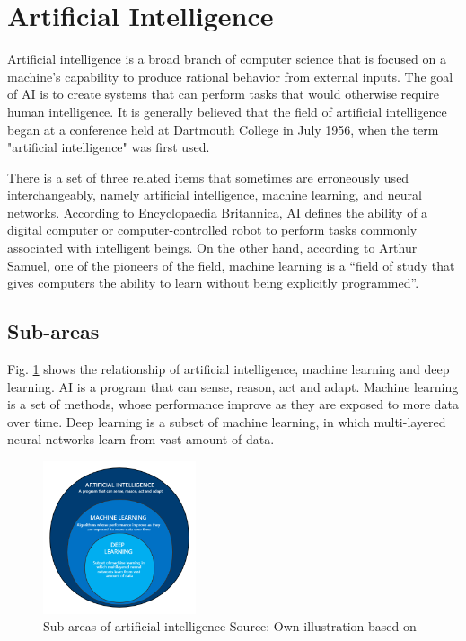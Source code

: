 \section{Artificial Intelligence}
Artificial intelligence is a broad branch of computer science that is focused on a machine’s capability to produce rational behavior from external inputs. The goal of AI is to create systems that can perform tasks that would otherwise require human intelligence. It is generally believed that the field of artificial intelligence began at a conference held at Dartmouth College in July 1956, when the term "artificial intelligence" was first used\parencite{Brunette2009}.

There is a set of three related items that sometimes are erroneously used interchangeably, namely artificial intelligence, machine learning, and neural networks. According to Encyclopaedia Britannica, AI defines the ability of a digital computer or computer-controlled robot to perform tasks commonly associated with intelligent beings. On the other hand, according to Arthur Samuel, one of the pioneers of the field, machine learning is a “field of study that gives computers the ability to learn without being explicitly programmed”\parencite{Samuel1959, Bhavsar2017}.

\subsection{Sub-areas}
Fig. \ref{fig:ai_taxonomy} shows the relationship of artificial intelligence, machine learning and deep learning. AI is a program that can sense, reason, act and adapt. Machine learning is a set of methods, whose performance improve as they are exposed to more data over time.	Deep learning is a subset of machine learning, in which multi-layered neural networks learn from vast amount of data.

\begin{figure}[htbp]
\centering
\includegraphics[width=0.4\textwidth]{./images/ai_taxonomy.png}
\caption{Sub-areas of artificial intelligence Source: Own illustration based
on\parencite{Suman2020}}
\label{fig:ai_taxonomy}
\end{figure}

